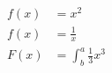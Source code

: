 \documentclass{article}
\begin{document}
	\begin{align*}
		f (x) &= x^2 \\
		f(x) &= \frac{1}{x}\\
		F(x) &=\int^a_b \frac{1}{3}x^3
	\end{align*}
\end{document}
